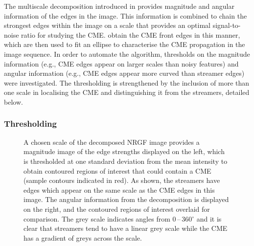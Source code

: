 \documentclass[namedreferences]{SolarPhysics}
\begin{document}
\begin{article}
\indent The multiscale decomposition introduced in \citet{2008SoPh..248..457Y} provides magnitude and angular information of the edges in the image. This information is combined to chain the strongest edges within the image on a scale that provides an optimal signal-to-noise ratio for studying the CME. \citet{2009A&A...495..325B} obtain the CME front edges in this manner, which are then used to fit an ellipse to characterise the CME propagation in the image sequence. In order to automate the algorithm, thresholds on the magnitude information (e.g., CME edges appear on larger scales than noisy features) and angular information (e.g., CME edges appear more curved than streamer edges) were investigated. The thresholding is strengthened by the inclusion of more than one scale in localising the CME and distinguishing it from the streamers, detailed below.

\subsubsection{Thresholding}

\begin{figure}[!ht]
\caption{A chosen scale of the decomposed NRGF image provides a magnitude image of the edge strengths displayed on the left, which is thresholded at one standard deviation from the mean intensity to obtain contoured regions of interest that could contain a CME (sample contours indicated in red). As shown, the streamers have edges which appear on the same scale as the CME edges in this image. The angular information from the decomposition is displayed on the right, and the contoured regions of interest overlaid for comparison. The grey scale indicates angles from 0\,--\,360$^{\circ}$ and it is clear that streamers tend to have a linear grey scale while the CME has a gradient of greys across the scale.}
\label{modalpmapcontour}
\end{figure}


\end{article}
\end{document}
